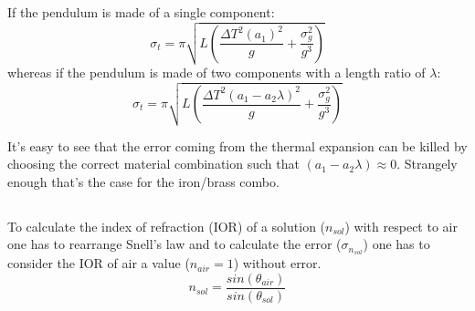 \documentclass[twocolumn]{article}
\begin{document}
		If the pendulum is made of a single component:
		\begin{equation}
		\sigma_t  = \pi \sqrt{L \left(\frac{\Delta T^{2} \left(a_{1} \right)^{2}}{g} + \frac{\sigma_{g}^{2}}{g^{3}}\right)}
		\end{equation}
		whereas if the pendulum is made of two components with a length ratio of $\lambda$:
		\begin{equation}
		\sigma_t  = \pi \sqrt{L \left(\frac{ \Delta  T^{2} \left(a_{1} - a_{2} \lambda \right)^{2}}{g} + \frac{\sigma_{g}^{2}}{g^{3}}\right)}
		\end{equation}

		It's easy to see that the error coming from the thermal expansion can be killed by choosing the correct material combination such that $ \left(a_{1} - a_{2} \lambda\right) \approx 0 $. Strangely enough that's the case for the iron/brass combo.
	\subsection{} %
	\label{sub:snell}
		To calculate the index of refraction (IOR) of a solution ($n_{sol}$) with respect to air one has to rearrange Snell's law and to calculate the error ($\sigma_{n_{sol}}$) one has to consider the IOR of air a value ($n_{air} =1 $) without error.
		\begin{equation}
		n_{sol} = \frac{ sin(\theta_{air})}{sin(\theta_{sol})} 
		\end{equation}
\end{document}
